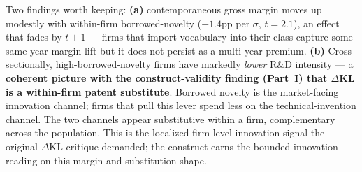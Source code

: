 \documentclass[11pt]{report}
\begin{document}
\noindent Two findings worth keeping: \textbf{(a)} contemporaneous gross
margin moves up modestly with within-firm borrowed-novelty
($+1.4$pp per $\sigma$, $t = 2.1$), an effect that fades by $t+1$ ---
firms that import vocabulary into their class capture some same-year margin
lift but it does not persist as a multi-year premium. \textbf{(b)}
Cross-sectionally, high-borrowed-novelty firms have markedly \emph{lower}
R\&D intensity --- a \textbf{coherent picture with the construct-validity
finding (Part~I) that $\Delta$KL is a within-firm patent substitute}. Borrowed
novelty is the market-facing innovation channel; firms that pull this lever
spend less on the technical-invention channel. The two channels appear
substitutive within a firm, complementary across the population. This is
the localized firm-level innovation signal the original $\Delta$KL critique
demanded; the construct earns the bounded innovation reading on this
margin-and-substitution shape.
\end{document}
